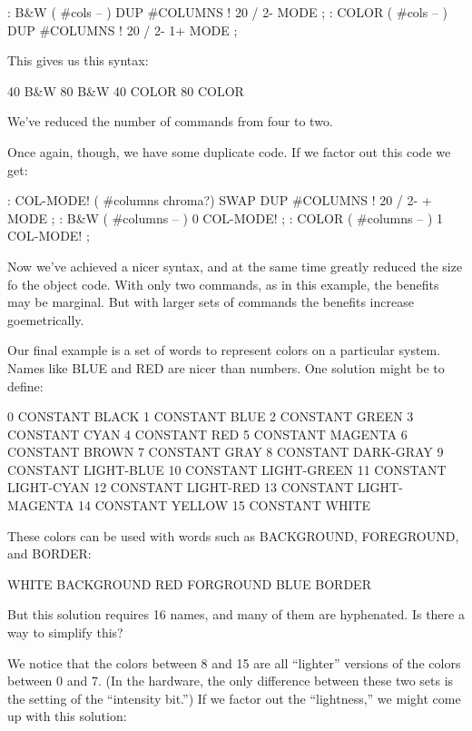 \begin{Code}
: B&W    ( #cols -- )  DUP #COLUMNS !  20 /  2-     MODE ;
: COLOR  ( #cols -- )  DUP #COLUMNS !  20 /  2-  1+ MODE ;
\end{Code}
This gives us this syntax:

\begin{Code}
40 B&W
80 B&W
40 COLOR
80 COLOR
\end{Code}
We've reduced the number of commands from four to two.

Once again, though, we have some duplicate code. If we factor out this code we get:

\begin{Code}
: COL-MODE!  ( #columns chroma?)
   SWAP DUP #COLUMNS !  20 / 2-  +  MODE ;
: B&W    ( #columns -- )  0 COL-MODE! ;
: COLOR  ( #columns -- )  1 COL-MODE! ;
\end{Code}

\noindent
Now we've achieved a nicer syntax, and at the same time greatly reduced the size fo the object code. With only two commands, as in this example, the benefits may be marginal. But with larger sets of commands the benefits increase goemetrically.

Our final example is a set of words to represent colors on a particular system. Names like BLUE and RED are nicer than numbers. One solution might be to define:

\begin{Code}
 0 CONSTANT BLACK                 1 CONSTANT BLUE
 2 CONSTANT GREEN                 3 CONSTANT CYAN
 4 CONSTANT RED                   5 CONSTANT MAGENTA
 6 CONSTANT BROWN                 7 CONSTANT GRAY
 8 CONSTANT DARK-GRAY             9 CONSTANT LIGHT-BLUE
10 CONSTANT LIGHT-GREEN          11 CONSTANT LIGHT-CYAN
12 CONSTANT LIGHT-RED            13 CONSTANT LIGHT-MAGENTA
14 CONSTANT YELLOW               15 CONSTANT WHITE
\end{Code}
These colors can be used with words such as BACKGROUND, FOREGROUND, and BORDER:

\begin{Code}
WHITE BACKGROUND  RED FORGROUND  BLUE BORDER
\end{Code}
But this solution requires 16 names, and many of them are hyphenated. Is there a way to simplify this?

We notice that the colors between 8 and 15 are all ``lighter'' versions of the colors between 0 and 7. (In the hardware, the only difference between these two sets is the setting of the ``intensity bit.'') If we factor out the ``lightness,'' we might come up with this solution:

